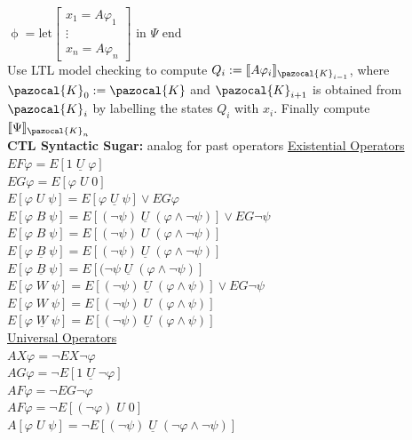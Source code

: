 \documentclass{article}
\newcommand{\Kb}{\pazocal{K}}
\begin{document}
\begin{multicols}{4}
$\upphi = \text{let} \begin{bmatrix}
x_1 = A\varphi_1\\
\vdots \\
x_n = A\varphi_n
\end{bmatrix}
\text{ in } \Psi \text{ end}$\\
Use LTL model checking to compute $Q_i:=\llbracket A\varphi_i\rrbracket _{\Kb_{i-1}}$, where $\Kb_0 := \Kb$ and $\Kb_{i+1}$ is obtained from $\Kb_i$ by labelling the states $Q_i$ with $x_i$.
Finally compute $\llbracket \Psi \rrbracket_{\Kb_n}$\\
\vfill
\columnbreak
\textbf{CTL Syntactic Sugar:} analog for past operators
\underline{Existential Operators}\\
$EF\varphi =  E[1 \; \underline{U} \; \varphi]  $ \\
$EG\varphi =  E[\varphi \; U \; 0]  $ \\
$E[ \varphi \; U \; \psi] =  E[\varphi \; \underline{U}\; \psi] \vee EG\varphi  $ \\
$E[ \varphi \; B \; \psi] =  E[(\neg \psi) \; \underline{U}\; (\varphi \wedge \neg \psi)] \vee EG\neg \psi  $ \\
$E[ \varphi \; B \; \psi] =  E[(\neg \psi) \; U\; (\varphi \wedge \neg \psi)] $ \\
$E[ \varphi \; \underline{B} \; \psi] =  E[(\neg \psi) \; \underline{U}\; (\varphi \wedge \neg \psi)] $ \\
$E[ \varphi \; \underline{B} \; \psi] =  E[(\neg \psi \; \underline{U}\; (\varphi \wedge \neg \psi)] $ \\
$E[ \varphi \; W \; \psi] =  E[(\neg \psi) \; \underline{U}\; (\varphi \wedge \psi)] \vee EG\neg \psi  $ \\
$E[ \varphi \; W \; \psi] =  E[(\neg \psi) \; U\; (\varphi \wedge \psi)] $ \\
$E[ \varphi \; \underline{W} \; \psi] =  E[(\neg \psi) \; \underline{U}\; (\varphi \wedge \psi)] $ \\
\underline{Universal Operators} \\
$AX\varphi =  \neg EX \neg \varphi \qquad$ \\
$AG\varphi=  \neg E[1 \; \underline{U} \; \neg \varphi] $ \\
$AF\varphi =  \neg EG \neg \varphi $ \\
$AF\varphi =  \neg E[(\neg \varphi)\; U\; 0] $ \\
$A[\varphi \; U\; \psi]=  \neg E[(\neg \psi)\; \underline{U} \; (\neg \varphi \wedge \neg \psi)] $ \\

\end{multicols}
\end{document}
